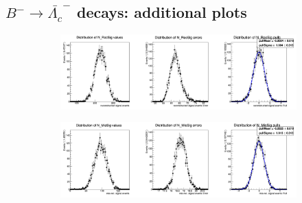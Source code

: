 %

\subsection{$B^- \rightarrow \bar{\Lambda_c}^-$ decays: additional plots}
\label{sec:chargedAnticorrApp}

\begin{figure}[H]
  \begin{subfigure}{14.5cm}
    \centering\includegraphics[width=13.8cm]{A3-Appendix/figs/2DanticorrLambdaC_NrecSig_mcstudy.png}
  \end{subfigure}
  \begin{subfigure}{14.5cm}
    \centering\includegraphics[width=13.8cm]{A3-Appendix/figs/2DanticorrLambdaC_NmisSig_mcstudy.png}
  \end{subfigure}
 

\end{figure}
